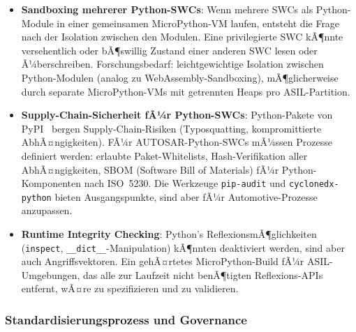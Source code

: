﻿\documentclass[12pt,a4paper,twoside]{article}
\begin{document}
\begin{itemize}
  \item \textbf{Sandboxing mehrerer Python-SWCs}:
        Wenn mehrere SWCs als Python-Module in einer gemeinsamen MicroPython-VM
        laufen, entsteht die Frage nach der Isolation zwischen den Modulen.
        Eine privilegierte SWC kÃ¶nnte versehentlich oder bÃ¶swillig Zustand
        einer anderen SWC lesen oder Ã¼berschreiben.
        Forschungsbedarf: leichtgewichtige Isolation zwischen Python-Modulen
        (analog zu WebAssembly-Sandboxing), mÃ¶glicherweise durch
        separate MicroPython-VMs mit getrennten Heaps pro ASIL-Partition.

  \item \textbf{Supply-Chain-Sicherheit fÃ¼r Python-SWCs}:
        Python-Pakete von PyPI~\cite{pypi_stats2024} bergen Supply-Chain-Risiken
        (Typosquatting, kompromittierte AbhÃ¤ngigkeiten).
        FÃ¼r AUTOSAR-Python-SWCs mÃ¼ssen Prozesse definiert werden:
        erlaubte Paket-Whitelists, Hash-Verifikation aller AbhÃ¤ngigkeiten,
        SBOM (Software Bill of Materials) fÃ¼r Python-Komponenten nach ISO~5230.
        Die Werkzeuge \texttt{pip-audit} und \texttt{cyclonedx-python} bieten
        Ausgangspunkte, sind aber fÃ¼r Automotive-Prozesse anzupassen.

  \item \textbf{Runtime Integrity Checking}:
        Python's ReflexionsmÃ¶glichkeiten (\texttt{inspect}, \newline \texttt{\_\_dict\_\_}-Manipulation)
        kÃ¶nnten deaktiviert werden, sind aber auch Angriffsvektoren.
        Ein gehÃ¤rtetes MicroPython-Build fÃ¼r ASIL-Umgebungen, das alle
        zur Laufzeit nicht benÃ¶tigten Reflexions-APIs entfernt, wÃ¤re
        zu spezifizieren und zu validieren.
\end{itemize}

\subsubsection{Standardisierungsprozess und Governance}
\end{document}
